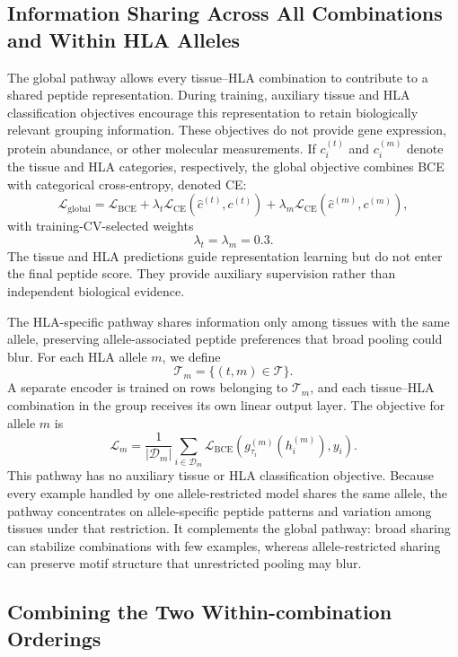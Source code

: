 \subsection{Information Sharing Across All Combinations and Within HLA Alleles}

The global pathway allows every tissue--HLA combination to contribute to a shared peptide representation. During training, auxiliary tissue and HLA classification objectives encourage this representation to retain biologically relevant grouping information. These objectives do not provide gene expression, protein abundance, or other molecular measurements. If \(c_i^{(t)}\) and \(c_i^{(m)}\) denote the tissue and HLA categories, respectively, the global objective combines BCE with categorical cross-entropy, denoted CE:
\[
\mathcal{L}_{\mathrm{global}}
=
\mathcal{L}_{\mathrm{BCE}}
+
\lambda_t
\mathcal{L}_{\mathrm{CE}}
\left(
\widehat{c}^{(t)},c^{(t)}
\right)
+
\lambda_m
\mathcal{L}_{\mathrm{CE}}
\left(
\widehat{c}^{(m)},c^{(m)}
\right),
\]
with training-CV-selected weights
\[
\lambda_t=\lambda_m=0.3.
\]
The tissue and HLA predictions guide representation learning but do not enter the final peptide score. They provide auxiliary supervision rather than independent biological evidence.

The HLA-specific pathway shares information only among tissues with the same allele, preserving allele-associated peptide preferences that broad pooling could blur. For each HLA allele \(m\), we define
\[
\mathcal{T}_m
=
\{(t,m)\in\mathcal{T}\}.
\]
A separate encoder is trained on rows belonging to \(\mathcal{T}_m\), and each tissue--HLA combination in the group receives its own linear output layer. The objective for allele \(m\) is
\[
\mathcal{L}_{m}
=
\frac{1}{|\mathcal{D}_m|}
\sum_{i\in\mathcal{D}_m}
\mathcal{L}_{\mathrm{BCE}}
\left(
g^{(m)}_{\tau_i}(h_i^{(m)}),y_i
\right).
\]
This pathway has no auxiliary tissue or HLA classification objective. Because every example handled by one allele-restricted model shares the same allele, the pathway concentrates on allele-specific peptide patterns and variation among tissues under that restriction. It complements the global pathway: broad sharing can stabilize combinations with few examples, whereas allele-restricted sharing can preserve motif structure that unrestricted pooling may blur.

\subsection{Combining the Two Within-combination Orderings}


